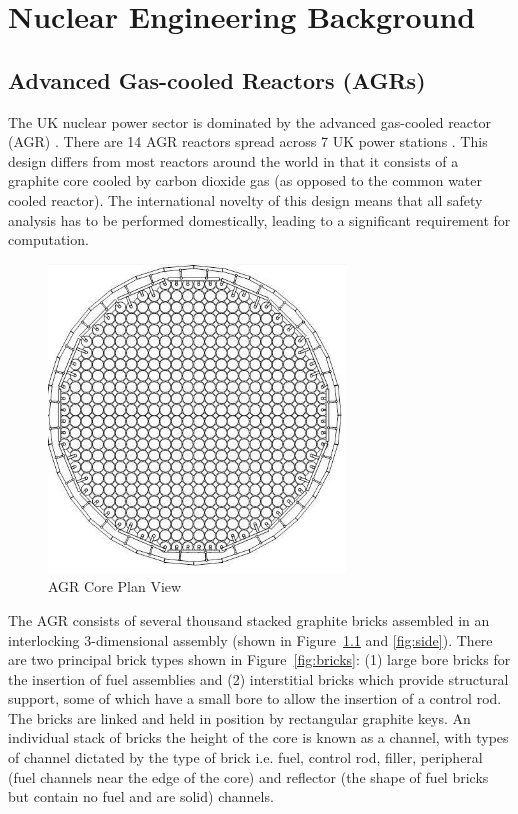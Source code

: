 \chapter{Nuclear Engineering Background}
\label{cha:engineering}

\section{Advanced Gas-cooled Reactors (AGRs)} \label{AGR}

The UK nuclear power sector is dominated by the advanced gas-cooled reactor  (AGR) \cite{nonbol1996description}. There are 14 AGR reactors spread across 7 UK power stations . This design differs from most reactors around the world in that it consists of a graphite core cooled by carbon dioxide gas (as opposed to the common water cooled reactor). The international novelty of this design means that all safety analysis has to be performed domestically, leading to a significant requirement for computation.

\begin{figure}[ht!]
	\centering
	\includegraphics[scale=0.75]{Figures/AGR_plan.png}
	\caption{AGR Core Plan View}
	\label{fig:schematic}
\end{figure}

\noindent
The AGR consists of several thousand stacked graphite bricks assembled in an interlocking 3-dimensional assembly (shown in Figure~\ref{fig:schematic} and \ref{fig:side}). There are two principal brick types shown in Figure~\ref{fig:bricks}: (1) large bore bricks for the insertion of fuel assemblies and (2) interstitial bricks which provide structural support, some of which have a small bore to allow the insertion of a control rod. The bricks are linked and held in position by rectangular graphite keys. An individual stack of bricks the height of the core is known as a channel, with types of channel dictated by the type of brick i.e. fuel, control rod, filler, peripheral (fuel channels near the edge of the core) and reflector (the shape of fuel bricks but contain no fuel and are solid) channels. 

